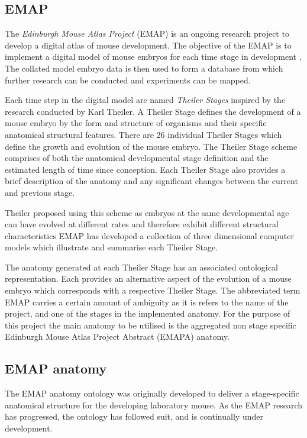 \subsection{EMAP}
The \textit{Edinburgh Mouse Atlas Project} (EMAP) is an ongoing research project to develop a digital atlas of mouse development. The objective of the EMAP is to implement a digital model of mouse embryos for each time stage in development \cite{emap}. The collated model embryo data is then used to form a database from which further research can be conducted and experiments can be mapped.
 
Each time step in the digital model are named \textit{Theiler Stages} inspired by the research conducted by Karl Theiler. A Theiler Stage defines the development of a mouse embryo by the form and structure of organisms and their specific anatomical structural features. There are 26 individual Theiler Stages which define the growth and evolution of the mouse embryo. The Theiler Stage scheme comprises of both the anatomical developmental stage definition and the estimated length of time since conception. Each Theiler Stage also provides a brief description of the anatomy and any significant changes between the current and previous stage.

Theiler proposed using this scheme as embryos at the same developmental age can have evolved at different rates and therefore exhibit different structural characteristics  EMAP has developed a collection of three dimensional computer models which illustrate and summarise each Theiler Stage.\cite{emap} 

The anatomy generated at each Theiler Stage has an associated ontological representation. Each provides an alternative aspect of the evolution of a mouse embryo which corresponds with a respective Theiler Stage. The abbreviated term EMAP carries a certain amount of ambiguity as it is refers to the name of the project, and one of the stages in the implemented anatomy. For the purpose of this project the main anatomy to be utilised is the aggregated non stage specific Edinburgh Mouse Atlas Project Abstract (EMAPA) anatomy.

\subsection{EMAP anatomy}
The EMAP anatomy ontology was originally developed to deliver a stage-specific anatomical structure for the developing laboratory mouse. As the EMAP research has progressed, the ontology has followed suit, and is continually under development.

